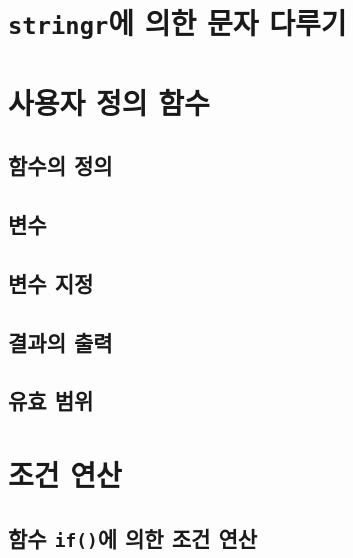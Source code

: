\documentclass[
]{book}
\begin{document}
\hypertarget{stringruxc5d0-uxc758uxd55c-uxbb38uxc790-uxb2e4uxb8e8uxae30}{%
\section{\texorpdfstring{\texttt{stringr}에 의한 문자 다루기}{stringr에 의한 문자 다루기}}\label{stringruxc5d0-uxc758uxd55c-uxbb38uxc790-uxb2e4uxb8e8uxae30}}

\hypertarget{uxc0acuxc6a9uxc790-uxc815uxc758-uxd568uxc218}{%
\section{사용자 정의 함수}\label{uxc0acuxc6a9uxc790-uxc815uxc758-uxd568uxc218}}

\hypertarget{uxd568uxc218uxc758-uxc815uxc758}{%
\subsection{함수의 정의}\label{uxd568uxc218uxc758-uxc815uxc758}}

\hypertarget{uxbcc0uxc218}{%
\subsection{변수}\label{uxbcc0uxc218}}

\hypertarget{uxbcc0uxc218-uxc9c0uxc815}{%
\subsection{변수 지정}\label{uxbcc0uxc218-uxc9c0uxc815}}

\hypertarget{uxacb0uxacfcuxc758-uxcd9cuxb825}{%
\subsection{결과의 출력}\label{uxacb0uxacfcuxc758-uxcd9cuxb825}}

\hypertarget{uxc720uxd6a8-uxbc94uxc704}{%
\subsection{유효 범위}\label{uxc720uxd6a8-uxbc94uxc704}}

\hypertarget{uxc870uxac74-uxc5f0uxc0b0}{%
\section{조건 연산}\label{uxc870uxac74-uxc5f0uxc0b0}}

\hypertarget{uxd568uxc218-ifuxc5d0-uxc758uxd55c-uxc870uxac74-uxc5f0uxc0b0}{%
\subsection{\texorpdfstring{함수 \texttt{if()}에 의한 조건 연산}{함수 if()에 의한 조건 연산}}\label{uxd568uxc218-ifuxc5d0-uxc758uxd55c-uxc870uxac74-uxc5f0uxc0b0}}
\end{document}

